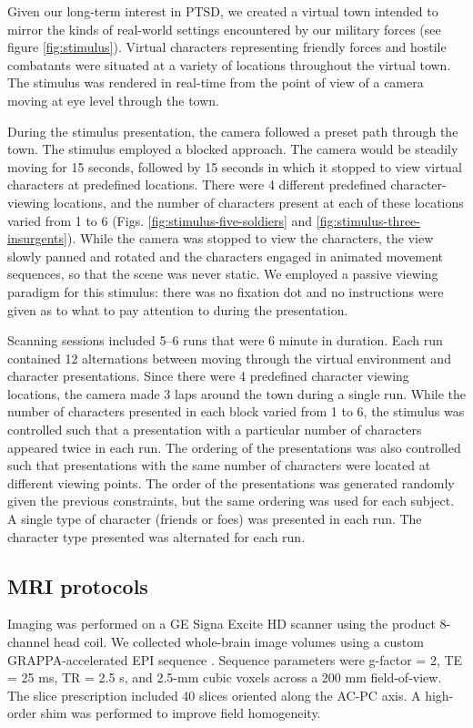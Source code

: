 \documentclass[preprint,5p,authoryear]{elsarticle}
\begin{document}
Given our long-term interest in PTSD, we created a virtual town intended to mirror the kinds of real-world settings encountered by our military forces (see figure \ref{fig:stimulus}).
Virtual characters representing friendly forces and hostile combatants were situated at a variety of locations throughout the virtual town.
The stimulus was rendered in real-time from the point of view of a camera moving at eye level through the town. 

During the stimulus presentation, the camera followed a preset path through the town.
The stimulus employed a blocked approach. The camera would be steadily moving for 15 seconds, followed by 15 seconds in which it stopped to view virtual characters at predefined locations.
There were 4 different predefined character-viewing locations, and the number of characters present at each of these locations varied from 1 to 6 (Figs. \ref{fig:stimulus-five-soldiers} and \ref{fig:stimulus-three-insurgents}).
While the camera was stopped to view the characters, the view slowly panned and rotated and the characters engaged in animated movement sequences, so that the scene was never static.
We employed a passive viewing paradigm for this stimulus: there was no fixation dot and no instructions were given as to what to pay attention to during the presentation.

Scanning sessions included 5--6 runs that were 6 minute in duration.
Each run contained 12 alternations between moving through the virtual environment and character presentations. 
Since there were 4 predefined character viewing locations, the camera made 3 laps around the town during a single run.
While the number of characters presented in each block varied from 1 to 6, the stimulus was controlled such that a presentation with a particular number of characters appeared twice in each run.
The ordering of the presentations was also controlled such that presentations with the same number of characters were located at different viewing points.
The order of the presentations was generated randomly given the previous constraints, but the same ordering was used for each subject.
A single type of character (friends or foes) was presented in each run. 
The character type presented was alternated for each run.

\subsection{MRI protocols}
Imaging was performed on a GE Signa Excite HD scanner using the product 8-channel head coil.
We collected whole-brain image volumes using a custom GRAPPA-accelerated EPI sequence \citep{Griswold2002}. 
Sequence parameters were g-factor = 2,  TE = 25 ms, TR = 2.5 s, and  2.5-mm cubic voxels across a 200 mm field-of-view. 
The slice prescription included 40 slices oriented along the AC-PC axis. 
A high-order shim was  performed to improve field homogeneity.
\end{document}
